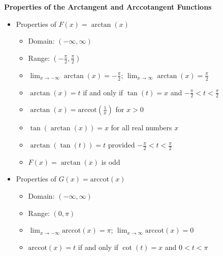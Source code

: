 \documentclass{ximera}
\begin{document}
\begin{theorem} \label{arctangentcotangentfunctionprops}  \textbf{Properties of the Arctangent and Arccotangent Functions}     

\begin{itemize}

\item Properties of $F(x)= \arctan(x)$

\begin{itemize}

\item Domain: $(-\infty, \infty)$

\item Range: $\left(-\frac{\pi}{2}, \frac{\pi}{2}\right)$

\item  $\lim_{x \rightarrow -\infty} \arctan(x)= -\frac{\pi}{2}$;  $\lim_{x \rightarrow \infty} \arctan(x) =\frac{\pi}{2}$

\item  $\arctan(x) = t$ if and only if $\tan(t) = x$ and $-\frac{\pi}{2} < t < \frac{\pi}{2}$ 

\item  $\arctan(x) = \text{arccot}\left(\frac{1}{x}\right)$ for $x > 0$

\item  $\tan\left(\arctan(x)\right) = x$ for all real numbers $x$

\item  $\arctan(\tan(t)) = t$ provided $-\frac{\pi}{2} < t < \frac{\pi}{2}$

\item $F(x)= \arctan(x)$ is odd

\end{itemize}

\item Properties of $G(x) = \text{arccot}(x)$

\begin{itemize}

\item Domain: $(-\infty, \infty)$

\item Range: $(0, \pi)$

\item  $\lim_{x \rightarrow -\infty} \text{arccot}(x) =\pi$; $\lim_{x \rightarrow \infty} \text{arccot}(x) = 0$

\item  $\text{arccot}(x) = t$ if and only if $\cot(t) = x$ and $0 <  t < \pi$ 


\end{itemize}
\end{itemize}
\end{theorem}
\end{document}
